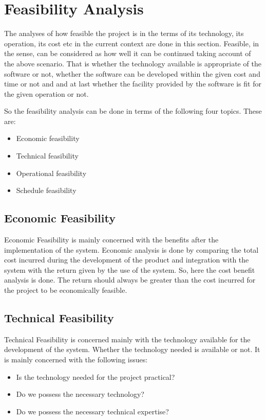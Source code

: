 \section{Feasibility Analysis}\label{sec:fa}
The analyses of how feasible the project is in the terms of its technology, its operation, its cost etc in the current context are 
done in this section. Feasible, in the sense, can be considered as how well it can be continued taking account of the above scenario.
That is whether the technology available is appropriate of the software or not, whether the software can be developed within the given cost and time or not and  and at last whether the facility provided 
by the software is fit for the given operation or not.

So the feasibility analysis can be done in terms of the following four topics. These are:
\begin{itemize}
    \item Economic feasibility 
	\item Technical feasibility
	\item Operational feasibility
	\item Schedule feasibility
	  
\end{itemize}
\subsection{Economic Feasibility}
 Economic Feasibility is mainly concerned with the benefits after the implementation of the system. Economic analysis is done by comparing the total cost incurred during the development of the product and integration with the system with the return given by the use of the system. So, here the cost benefit analysis is done. The return should always be greater than the cost incurred for the project to be economically feasible.

\subsection{Technical Feasibility}
Technical Feasibility is concerned mainly with the technology available for the development of the system. Whether the technology needed is 
available or not. It is mainly concerned with the following issues:
\begin{itemize}
\item Is the technology needed for the project practical?
\item Do we possess the necessary technology?
\item Do we possess the necessary technical expertise?

\end{itemize}

